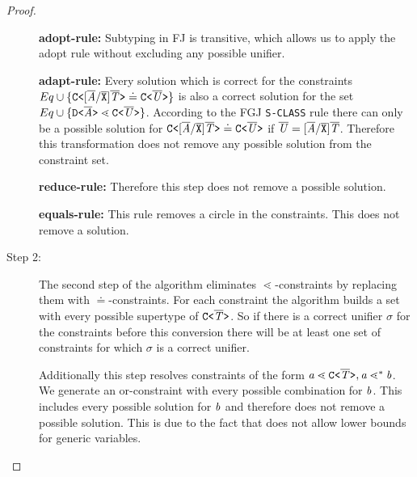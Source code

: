 \begin{proof}
\begin{description}
\textbf{adopt-rule:} Subtyping in FJ is transitive,
which allows us to apply the adopt rule without excluding any possible unifier.

\textbf{adapt-rule:} Every solution which is correct for the constraints
$Eq \cup \{  \mathtt{C \texttt{<} [\overline{\tt \mathit{A}}/\overline{\tt X}]\overline{\tt \mathit{T}} \texttt{>} } \doteq \mathtt{C \texttt{<} \overline{\tt \mathit{U}} \texttt{>} } \}$ is also
a correct solution for the set $Eq \cup \{  \mathtt{D \texttt{<} \overline{\tt \mathit{A}} \texttt{>} } \lessdot \mathtt{C \texttt{<} \overline{\tt \mathit{U}} \texttt{>} } \}$.
According to the FGJ \texttt{S-CLASS} rule there can only be a possible solution for 
$\mathtt{C \texttt{<} [\overline{\tt \mathit{A}}/\overline{\tt X}]\overline{\tt \mathit{T}} \texttt{>} } \doteq \mathtt{C \texttt{<} \overline{\tt \mathit{U}} \texttt{>} }$
if $\overline{\tt \mathit{U}} = [\overline{\tt \mathit{A}}/\overline{\tt X}]\overline{\tt \mathit{T}}$.
Therefore this transformation does not remove any possible solution from the constraint set.

\textbf{reduce-rule:}
Therefore this step does not remove a possible solution.

\textbf{equals-rule:}
This rule removes a circle in the constraints.
This does not remove a solution.

\item[Step 2:]
The second step of the algorithm eliminates $\lessdot$-constraints
by replacing them with $\doteq$-constraints.
For each  constraint the algorithm builds a set with every
possible supertype of $\mathtt{C \texttt{<} \overline{\tt \mathit{T}} \texttt{>} }$.
So if there is a correct unifier $\sigma$ for the constraints before this conversion there will be at least one set of
constraints for which $\sigma$ is a correct unifier.

Additionally this step resolves constraints of the form $\mathit{ a } \lessdot \mathtt{C \texttt{<} \overline{\tt \mathit{T}} \texttt{>} }, \mathit{ a } \lessdot^* \mathit{ b }$.
We generate an or-constraint with every possible combination for $\mathit{ b }$.
This includes every possible solution for $\mathit{ b }$ and therefore does not remove a possible solution.
This is due to the fact that \TFGJ does not allow lower bounds for generic variables.


\end{description}
\end{proof}
